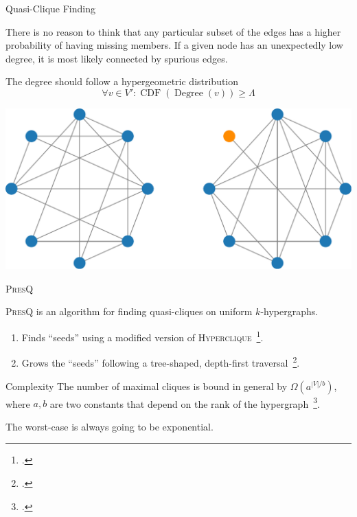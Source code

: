 \documentclass[10pt]{beamer}
\newcommand{\PresQ}[0]{\textsc{PresQ}\xspace}
\begin{document}
\begin{frame}{Quasi-Clique Finding}
    \begin{block}{}
    There is no reason to think that any particular subset of the edges
    has a higher probability of having missing members. If a given node has an
    unexpectedly low degree, it is most likely connected by spurious edges.
    \end{block}
    \begin{block}{The degree should follow a hypergeometric distribution}
    \begin{equation}
        \forall v \in V': \operatorname{CDF}(\operatorname{Degree}(v)) \ge \Lambda
    \end{equation}
    \end{block}
    \centering
    \includegraphics[width=0.6\linewidth]{quasicliques}

\end{frame}

\begin{frame}{\PresQ}

    \begin{block}{}
    \PresQ is an algorithm for finding quasi-cliques on uniform
    $k$-hypergraphs.
    
    \begin{enumerate}
        \item Finds ``seeds'' using a modified version of \textsc{Hyperclique}~\footcite{koeller2003discovery}.
        \item Grows the ``seeds'' following a tree-shaped, depth-first
        traversal~\footcite{uno_efficient_2010}.
    \end{enumerate}
    \end{block}
    
    \begin{alertblock}{Complexity}
        \smallskip
        The number of maximal cliques is bound in general by $\Omega(a^{|V|/b})$,
        where $a, b$ are two constants that depend on the rank of the hypergraph~\footcite{Tomescu1981}.
        
        The worst-case is always going to be exponential.
    \end{alertblock}
\end{frame}
\end{document}
